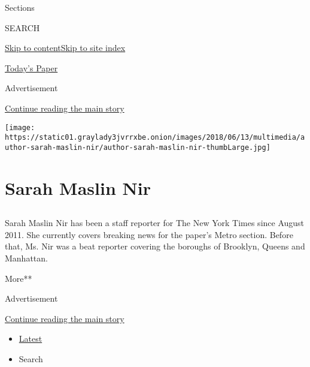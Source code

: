 Sections

SEARCH

\protect\hyperlink{site-content}{Skip to
content}\protect\hyperlink{site-index}{Skip to site index}

\href{https://myaccount.nytimes3xbfgragh.onion/auth/login?response_type=cookie\&client_id=vi}{}

\href{https://www.nytimes3xbfgragh.onion/section/todayspaper}{Today's
Paper}

Advertisement

\protect\hyperlink{after-top}{Continue reading the main story}

\texttt{[image: https://static01.graylady3jvrrxbe.onion/images/2018/06/13/multimedia/author-sarah-maslin-nir/author-sarah-maslin-nir-thumbLarge.jpg]}

\hypertarget{sarah-maslin-nir}{%
\section{Sarah Maslin Nir}\label{sarah-maslin-nir}}

\hypertarget{section}{%
\subsection{}\label{section}}

Sarah Maslin Nir has been a staff reporter for The New York Times since
August 2011. She currently covers breaking news for the paper's Metro
section. Before that, Ms. Nir was a beat reporter covering the boroughs
of Brooklyn, Queens and Manhattan.

More**

Advertisement

\protect\hyperlink{after-mid1}{Continue reading the main story}

\begin{itemize}
\tightlist
\item
  \protect\hyperlink{stream-panel}{Latest}
\item
  Search
\end{itemize}


